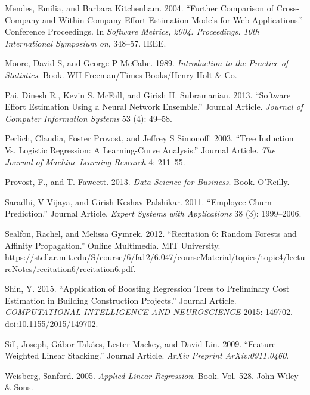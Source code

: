 \documentclass[]{elsarticle} %
\begin{document}
\hypertarget{ref-Mendes2004}{}
Mendes, Emilia, and Barbara Kitchenham. 2004. ``Further Comparison of
Cross-Company and Within-Company Effort Estimation Models for Web
Applications.'' Conference Proceedings. In \emph{Software Metrics, 2004.
Proceedings. 10th International Symposium on}, 348--57. IEEE.

\hypertarget{ref-Moore1989}{}
Moore, David S, and George P McCabe. 1989. \emph{Introduction to the
Practice of Statistics}. Book. WH Freeman/Times Books/Henry Holt \& Co.

\hypertarget{ref-Pai2013}{}
Pai, Dinesh R., Kevin S. McFall, and Girish H. Subramanian. 2013.
``Software Effort Estimation Using a Neural Network Ensemble.'' Journal
Article. \emph{Journal of Computer Information Systems} 53 (4): 49--58.

\hypertarget{ref-Perlich2003}{}
Perlich, Claudia, Foster Provost, and Jeffrey S Simonoff. 2003. ``Tree
Induction Vs. Logistic Regression: A Learning-Curve Analysis.'' Journal
Article. \emph{The Journal of Machine Learning Research} 4: 211--55.

\hypertarget{ref-Provost2013}{}
Provost, F., and T. Fawcett. 2013. \emph{Data Science for Business}.
Book. O'Reilly.

\hypertarget{ref-Saradhi2011}{}
Saradhi, V Vijaya, and Girish Keshav Palshikar. 2011. ``Employee Churn
Prediction.'' Journal Article. \emph{Expert Systems with Applications}
38 (3): 1999--2006.

\hypertarget{ref-Sealfon2012}{}
Sealfon, Rachel, and Melissa Gymrek. 2012. ``Recitation 6: Random
Forests and Affinity Propagation.'' Online Multimedia. MIT University.
\url{https://stellar.mit.edu/S/course/6/fa12/6.047/courseMaterial/topics/topic4/lectureNotes/recitation6/recitation6.pdf}.

\hypertarget{ref-Shin2015}{}
Shin, Y. 2015. ``Application of Boosting Regression Trees to Preliminary
Cost Estimation in Building Construction Projects.'' Journal Article.
\emph{COMPUTATIONAL INTELLIGENCE AND NEUROSCIENCE} 2015: 149702.
doi:\href{https://doi.org/10.1155/2015/149702}{10.1155/2015/149702}.

\hypertarget{ref-Sill2009}{}
Sill, Joseph, Gábor Takács, Lester Mackey, and David Lin. 2009.
``Feature-Weighted Linear Stacking.'' Journal Article. \emph{ArXiv
Preprint ArXiv:0911.0460}.

\hypertarget{ref-Weisberg2005}{}
Weisberg, Sanford. 2005. \emph{Applied Linear Regression}. Book. Vol.
528. John Wiley \& Sons.
\end{document}
